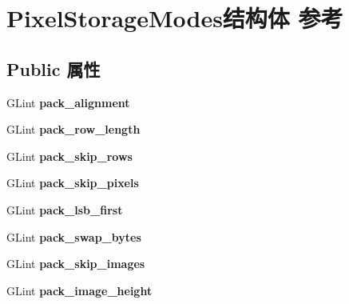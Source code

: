 \hypertarget{struct_pixel_storage_modes}{}\section{Pixel\+Storage\+Modes结构体 参考}
\label{struct_pixel_storage_modes}
\subsection*{Public 属性}
\begin{DoxyCompactItemize}
\item 
\mbox{\label{struct_pixel_storage_modes_a01792906c6bee33779d9335a5b94f07b}} 
G\+Lint {\bfseries pack\+\_\+alignment}
\item 
\mbox{\label{struct_pixel_storage_modes_aebf9a78eb1e7a72e8bb4fee94bb38fc7}} 
G\+Lint {\bfseries pack\+\_\+row\+\_\+length}
\item 
\mbox{\label{struct_pixel_storage_modes_a0e29ec689de1088ff5e39edba3b596e1}} 
G\+Lint {\bfseries pack\+\_\+skip\+\_\+rows}
\item 
\mbox{\label{struct_pixel_storage_modes_a0d41212f6a03668c41261045a14435c5}} 
G\+Lint {\bfseries pack\+\_\+skip\+\_\+pixels}
\item 
\mbox{\label{struct_pixel_storage_modes_a5b9c4ff9fa8f680c0360dbc0841fe9ca}} 
G\+Lint {\bfseries pack\+\_\+lsb\+\_\+first}
\item 
\mbox{\label{struct_pixel_storage_modes_aec31403d73864ee7fec4db633b312981}} 
G\+Lint {\bfseries pack\+\_\+swap\+\_\+bytes}
\item 
\mbox{\label{struct_pixel_storage_modes_a01ff640176331ae6636158c51c57ebaa}} 
G\+Lint {\bfseries pack\+\_\+skip\+\_\+images}
\item 
\mbox{\label{struct_pixel_storage_modes_af0f4fd265dc4c08a80ad31044a56c5f8}} 
G\+Lint {\bfseries pack\+\_\+image\+\_\+height}
\item 
\mbox{\label{struct_pixel_storage_modes_af1cdb775e16d54d24e23365261dfcdf8}} 

\end{DoxyCompactItemize}
